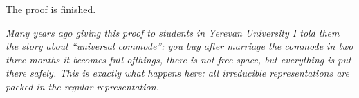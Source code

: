 The proof is finished.

{\it Many years ago giving this proof to students in Yerevan University
I told them the story about ``universal commode'': you buy after marriage
the commode in two three months it becomes full ofthings, there is not free space,
but everything is put there safely. This is exactly what happens here:
all irreducible representations are packed in the regular representation.}


\bye
 
